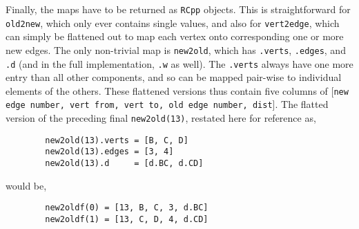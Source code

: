 \begin{spacing}{1.5}
    \noindent Finally, the maps have to be returned as {\tt RCpp} objects. This is straightforward for {\tt old2new}, which only ever contains
    single values, and also for {\tt vert2edge}, which can simply be flattened out to map each vertex onto corresponding one or more new edges.
    The only non-trivial map is {\tt new2old}, which has {\tt .verts}, {\tt .edges}, and {\tt .d} (and in the full implementation, {\tt .w} as
    well). The {\tt .verts} always have one more entry than all other components, and so can be mapped pair-wise to individual elements of the
    others. These flattened versions thus contain five columns of [{\tt new edge number, vert from, vert to, old edge number, dist}].  The
    flatted version of the preceding final {\tt new2old(13)}, restated here for reference as,
    \begin{lstlisting}
        new2old(13).verts = [B, C, D]
        new2old(13).edges = [3, 4]
        new2old(13).d     = [d.BC, d.CD]
    \end{lstlisting}
    would be,
    \begin{lstlisting}
        new2oldf(0) = [13, B, C, 3, d.BC]
        new2oldf(1) = [13, C, D, 4, d.CD]
    \end{lstlisting}
\end{spacing}

